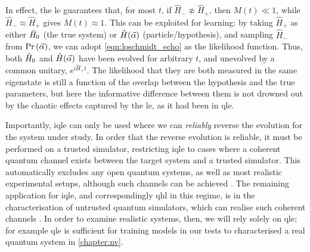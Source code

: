 \par 
In effect, the \gls{le} guarantees that, for most $t$, if $\hat{H}_{-} \not\approx \hat{H}_{+}$, then $M(t) \ll 1$, 
while $\hat{H}_{-} \approx \hat{H}_{+}$ gives $M(t) \approx 1$. 
This can be exploited for learning: 
by taking $\hat{H}_{+}$ as either $\hat{H}_0$ (the true system) or $\hat{H}(\vec{\alpha})$ (particle/hypothesis), 
and sampling $\hat{H}_{-}$ from $\Pr\left(\vec{\alpha}\right)$, 
we can adopt \cref{eqn:loschmidt_echo} as the \gls{likelihood} function.
Thus, both $\hat{H}_0$ and $\hat{H}(\vec{\alpha})$ have been evolved for arbitrary $t$, and unevolved by a common unitary, $e^{i\hat{H}_+ t}$.
The likelihood that they are both measured in the same eigenstate is still a function of the overlap between the 
hypothesis and the true parameters, but here the informative difference between them is not drowned out by the chaotic effects captured by the \gls{le},
as it had been in \gls{qle}.
\par 

Importantly, \gls{iqle} can only be used where we can \emph{reliably} reverse the evolution for the system under study. 
In order that the reverse evolution is reliable, it must be performed on a trusted simulator, 
restricting \gls{iqle} to cases where a coherent quantum channel exists between the target
system and a trusted simulator. 
This automatically excludes any open quantum systems, as well as most realistic 
experimental setups, although such channels can be achieved \cite{hensen2015loophole}. 
The remaining application for \gls{iqle}, and correspondingly \gls{qhl} in this regime, 
is in the characterisation of untrusted quantum simulators, 
which can realise such coherent channels \cite{wang2017experimental}. 
In order to examine realistic systems, then, we will rely solely on \gls{qle};
for example \gls{qle} is sufficient for training models in our tests to characterised
a real quantum system in \cref{chapter:nv}.


